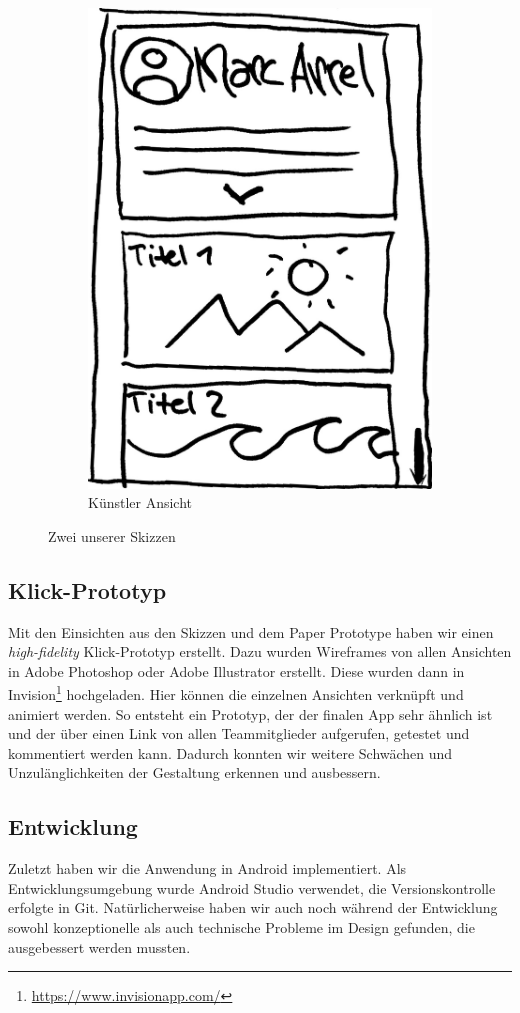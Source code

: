 \begin{figure}[width = 0.45\textwidth]
\begin{subfigure}[b]{0.22\textwidth}
        \includegraphics[width=\textwidth]{figures/kuenstler.jpg}
        \caption{Künstler Ansicht}
        \label{fig:tiger}
    \end{subfigure}
    \caption{Zwei unserer Skizzen}
    \label{fig:skizzen}
\end{figure}
\subsection{Klick-Prototyp}
Mit den Einsichten aus den Skizzen und dem Paper Prototype haben wir einen \textit{high-fidelity} Klick-Prototyp erstellt. Dazu wurden Wireframes von allen Ansichten in Adobe Photoshop oder Adobe Illustrator erstellt. Diese wurden dann in Invision\footnote{\url{https://www.invisionapp.com/}} hochgeladen. Hier können die einzelnen Ansichten verknüpft und animiert werden. So entsteht ein Prototyp, der der finalen  App sehr ähnlich ist und der über einen Link von allen Teammitglieder aufgerufen, getestet und kommentiert werden kann. Dadurch konnten wir weitere Schwächen und Unzulänglichkeiten der Gestaltung erkennen und ausbessern.
\subsection{Entwicklung}
Zuletzt haben wir die Anwendung in Android implementiert. Als Entwicklungsumgebung wurde Android Studio verwendet, die Versionskontrolle erfolgte in Git. Natürlicherweise haben wir auch noch während der Entwicklung sowohl konzeptionelle als auch technische Probleme im Design gefunden, die ausgebessert werden mussten.